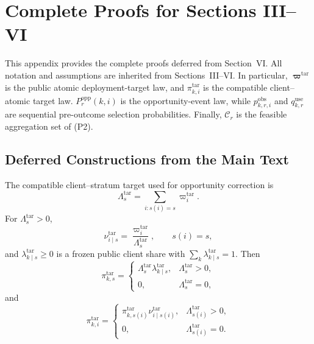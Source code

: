 \appendices
\section{Complete Proofs for Sections III--VI}
\label{app:complete_proofs}

This appendix provides the complete proofs deferred from
Section~VI.  All notation and assumptions are inherited from
Sections~III--VI.  In particular,
$\boldsymbol\varpi^{\mathrm{tar}}$ is the public atomic deployment-target law,
and $\pi^{\mathrm{tar}}_{k,i}$ is the compatible client--atomic target law.
$P_r^{\mathrm{opp}}(k,i)$ is the opportunity-event law, while
$p^{\mathrm{obs}}_{k,r,i}$ and $q^{\mathrm{use}}_{k,r}$ are sequential
pre-outcome selection probabilities.  Finally, $\mathcal{C}_r$ is the feasible
aggregation set of (P2).

\subsection{Deferred Constructions from the Main Text}
\label{app:deferred_constructions}

The compatible client--stratum target used for opportunity correction is
\begin{equation}
    \Lambda_s^{\mathrm{tar}}
    =
    \sum_{i:s(i)=s}\varpi_i^{\mathrm{tar}}.
    \label{eq:target_stratum_mass}
\end{equation}
For $\Lambda_s^{\mathrm{tar}}>0$,
\begin{equation}
    \nu^{\mathrm{tar}}_{i\mid s}
    =
    \frac{\varpi_i^{\mathrm{tar}}}
         {\Lambda_s^{\mathrm{tar}}},
    \qquad s(i)=s,
    \label{eq:target_conditional_atomic}
\end{equation}
and $\lambda^{\mathrm{tar}}_{k\mid s}\ge0$ is a frozen public client share
with $\sum_k\lambda^{\mathrm{tar}}_{k\mid s}=1$.  Then
\begin{equation}
 \pi^{\mathrm{tar}}_{k,s}
 =
 \begin{cases}
 \Lambda_s^{\mathrm{tar}}\lambda^{\mathrm{tar}}_{k\mid s},
 & \Lambda_s^{\mathrm{tar}}>0,\\
 0, & \Lambda_s^{\mathrm{tar}}=0,
 \end{cases}
 \label{eq:target_ks_mass}
\end{equation}
and
\begin{equation}
 \pi^{\mathrm{tar}}_{k,i}
 =
 \begin{cases}
 \pi^{\mathrm{tar}}_{k,s(i)}
 \nu^{\mathrm{tar}}_{i\mid s(i)},
 & \Lambda_{s(i)}^{\mathrm{tar}}>0,\\
 0, & \Lambda_{s(i)}^{\mathrm{tar}}=0.
 \end{cases}
 \label{eq:target_ki_mass}
\end{equation}

